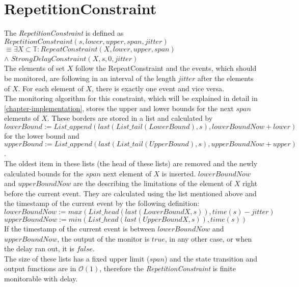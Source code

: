 \section{RepetitionConstraint}
	The \emph{RepetitionConstraint} is defined as\\[10pt]
		$RepetitionConstraint(s, lower, upper, span, jitter)$\\
		$\equiv \exists X\subset \mathbb{T}: RepeatConstraint (X, lower, upper, span)$\\
		\hspace{7cm}$\land$ $StrongDelayConstraint(X, s, 0, jitter)$\\[10pt]
	The elements of set $X$ follow the RepeatConstraint and the events, which should be monitored, are following in an interval of the length $jitter$ after the elements of $X$. For each element of $X$, there is exactly one event and vice versa.\\
	The monitoring algorithm for this constraint, which will be explained in detail in \ref{chapter-implementation}, stores the upper and lower bounds for the next $span$ elements of $X$.
	These borders are stored in a list and calculated by\\[10pt]
	$lowerBound:= List\_append(last(List\_tail(LowerBound), s), lowerBoundNow + lower)$ for the lower bound and\\
	$upperBound:= List\_append(last(List\_tail(UpperBound), s), upperBoundNow + upper)$.\\[10pt]
	The oldest item in these lists (the head of these lists) are removed and the newly calculated bounds for the $span$ next element of $X$ is inserted. $lowerBoundNow$ and $upperBoundNow$ are the describing the limitations of the element of $X$ right before the current event. They are calculated using the list mentioned above and the timestamp of the current event by the following definition:\\[10pt]
	$lowerBoundNow:= max(List\_head(last(LowerBoundX, s)), time(s)-jitter)$\\
	$upperBoundNow:= min(List\_head(last(UpperBoundX, s)), time(s))$\\[10pt]
	If the timestamp of the current event is between $lowerBoundNow$ and $upperBoundNow$, the output of the monitor is $true$, in any other case, or when the delay ran out, it is $false$.\\
	The size of these lists has a fixed upper limit ($span$) and the state transition and output functions are in $\mathcal{O}(1)$, therefore the \emph{RepetitionConstraint} is finite monitorable with delay.
	
